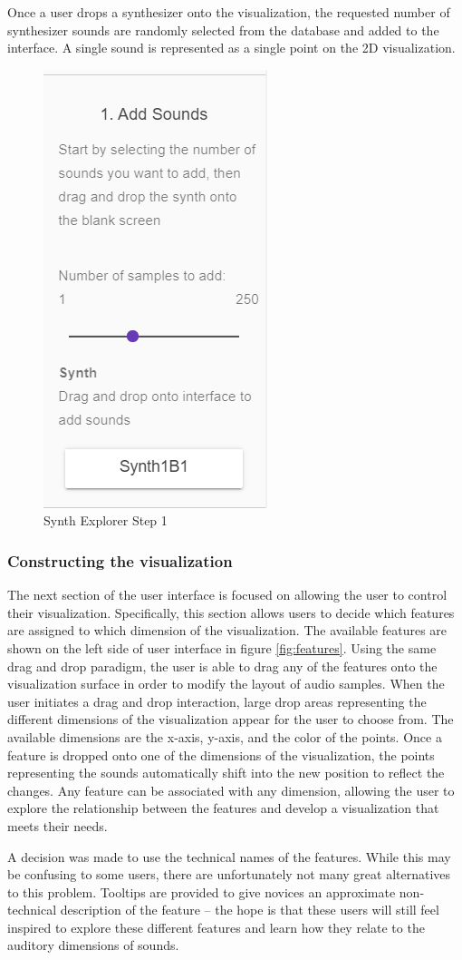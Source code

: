 Once a user drops a synthesizer onto the visualization, the requested number of synthesizer sounds are randomly selected from the database and added to the interface. A single sound is represented as a single point on the 2D visualization.

\begin{figure}
    \centering
    \includegraphics[width=0.2\linewidth]{SynthExplore_AddSounds.png}
    \caption{Synth Explorer Step 1}
    \label{fig:steup 1}
\end{figure}

\subsubsection{Constructing the visualization}
The next section of the user interface is focused on allowing the user to control their visualization. Specifically, this section allows users to decide which features are assigned to which dimension of the visualization. The available features are shown on the left side of user interface in figure \ref{fig:features}. Using the same drag and drop paradigm, the user is able to drag any of the features onto the visualization surface in order to modify the layout of audio samples. When the user initiates a drag and drop interaction, large drop areas representing the different dimensions of the visualization appear for the user to choose from. The available dimensions are the x-axis, y-axis, and the color of the points. Once a feature is dropped onto one of the dimensions of the visualization, the points representing the sounds automatically shift into the new position to reflect the changes. Any feature can be associated with any dimension, allowing the user to explore the relationship between the features and develop a visualization that meets their needs.

A decision was made to use the technical names of the features. While this may be confusing to some users, there are unfortunately not many great alternatives to this problem. Tooltips are provided to give novices an approximate non-technical description of the feature -- the hope is that these users will still feel inspired to explore these different features and learn how they relate to the auditory dimensions of sounds.

